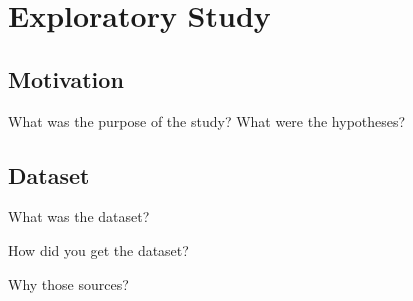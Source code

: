 \chapter{Exploratory Study}

\section{Motivation}
What was the purpose of the study?
What were the hypotheses?

\section{Dataset}
What was the dataset?


How did you get the dataset?
 

Why those sources?
 


 
 








